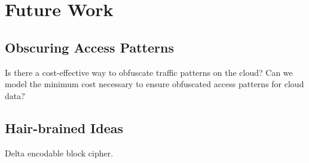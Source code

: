 \section{Future Work}

\subsection{Obscuring Access Patterns}

Is there a cost-effective way to obfuscate traffic patterns on the
cloud? Can we model the minimum cost necessary to ensure obfuscated
access patterns for cloud data?

\subsection{Hair-brained Ideas}

Delta encodable block cipher.
